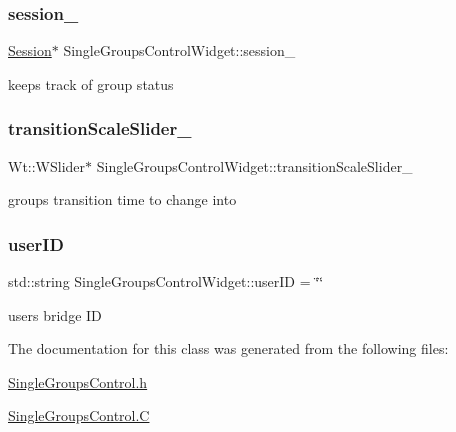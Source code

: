 \subsubsection{\texorpdfstring{session\+\_\+}{session\_}}
{\footnotesize\ttfamily \hyperlink{class_session}{Session}$\ast$ Single\+Groups\+Control\+Widget\+::session\+\_\+\hspace{0.3cm}{\ttfamily [private]}}

keeps track of group status \mbox{\label{class_single_groups_control_widget_af1811831d7031863931a9baaa97207a0}} 
\subsubsection{\texorpdfstring{transition\+Scale\+Slider\+\_\+}{transitionScaleSlider\_}}
{\footnotesize\ttfamily Wt\+::\+W\+Slider$\ast$ Single\+Groups\+Control\+Widget\+::transition\+Scale\+Slider\+\_\+\hspace{0.3cm}{\ttfamily [private]}}

group\textquotesingle{}s transition time to change into \mbox{\label{class_single_groups_control_widget_a8e485f9b17c2934de11f8991a7b38bf6}} 
\subsubsection{\texorpdfstring{user\+ID}{userID}}
{\footnotesize\ttfamily std\+::string Single\+Groups\+Control\+Widget\+::user\+ID = \char`\"{}\char`\"{}\hspace{0.3cm}{\ttfamily [private]}}

user\textquotesingle{}s bridge ID 

The documentation for this class was generated from the following files\+:\begin{DoxyCompactItemize}
\item 
\hyperlink{_single_groups_control_8h}{Single\+Groups\+Control.\+h}\item 
\hyperlink{_single_groups_control_8_c}{Single\+Groups\+Control.\+C}\end{DoxyCompactItemize}
